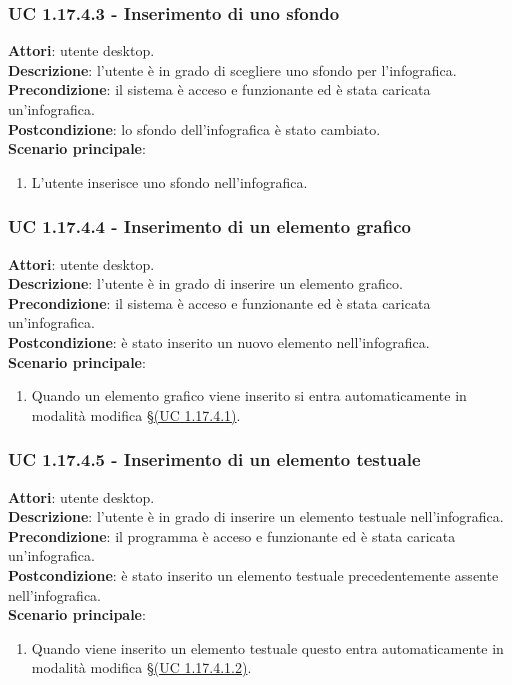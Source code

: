 \subsubsection{UC 1.17.4.3 - Inserimento di uno sfondo}{
	\label{uc1.17.4.3}
	\textbf{Attori}: utente desktop. \\
	\textbf{Descrizione}: l'utente è in grado di scegliere uno sfondo per l'infografica. \\
	\textbf{Precondizione}: il sistema è acceso e funzionante ed è stata caricata un'infografica.	\\
	\textbf{Postcondizione}: lo sfondo dell'infografica è stato cambiato.\\
	\textbf{Scenario principale}:
	\begin{enumerate}
		\item L'utente inserisce uno sfondo nell'infografica.
	\end{enumerate}			
	}
\subsubsection{UC 1.17.4.4 - Inserimento di un elemento grafico}{
	\label{uc1.17.4.4}
	\textbf{Attori}: utente desktop. \\
	\textbf{Descrizione}: l'utente è in grado di inserire un elemento grafico. \\
	\textbf{Precondizione}: il sistema è acceso e funzionante ed è stata caricata un'infografica.	\\
	\textbf{Postcondizione}: è stato inserito un nuovo elemento nell'infografica.\\
	\textbf{Scenario principale}:
	\begin{enumerate}
		\item Quando un elemento grafico viene inserito si entra automaticamente in modalità modifica \S\hyperref[uc1.17.4.1]{(UC 1.17.4.1)}.
	\end{enumerate}
	}
\subsubsection{UC 1.17.4.5 - Inserimento di un elemento testuale}{
	\label{uc1.17.4.5}
	\textbf{Attori}: utente desktop. \\
	\textbf{Descrizione}: l'utente è in grado di inserire un elemento testuale nell'infografica. \\
	\textbf{Precondizione}: il programma è acceso e funzionante ed è stata caricata un'infografica.	\\
	\textbf{Postcondizione}: è stato inserito un elemento testuale precedentemente assente nell'infografica.	\\
	\textbf{Scenario principale}:
	\begin{enumerate}
		\item Quando viene inserito un elemento testuale questo entra automaticamente in modalità modifica \S\hyperref[uc1.17.4.1.2]{(UC 1.17.4.1.2)}.
	\end{enumerate}
	}
